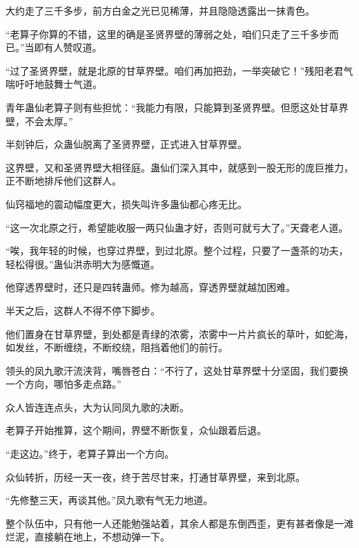 \begin{this_body}
大约走了三千多步，前方白金之光已见稀薄，并且隐隐透露出一抹青色。

“老算子你算的不错，这里的确是圣贤界壁的薄弱之处，咱们只走了三千多步而已。”当即有人赞叹道。

“过了圣贤界壁，就是北原的甘草界壁。咱们再加把劲，一举突破它！”残阳老君气喘吁吁地鼓舞士气道。

青年蛊仙老算子则有些担忧：“我能力有限，只能算到圣贤界壁。但愿这处甘草界壁，不会太厚。”

半刻钟后，众蛊仙脱离了圣贤界壁，正式进入甘草界壁。

这界壁，又和圣贤界壁大相径庭。蛊仙们深入其中，就感到一股无形的庞巨推力，正不断地排斥他们这群人。

仙窍福地的震动幅度更大，损失叫许多蛊仙都心疼无比。

“这一次北原之行，希望能收服一两只仙蛊才好，否则可就亏大了。”天聋老人道。

“唉，我年轻的时候，也穿过界壁，到过北原。整个过程，只要了一盏茶的功夫，轻松得很。”蛊仙洪赤明大为感慨道。

他穿透界壁时，还只是四转蛊师。修为越高，穿透界壁就越加困难。

半天之后，这群人不得不停下脚步。

他们置身在甘草界壁，到处都是青绿的浓雾，浓雾中一片片疯长的草叶，如蛇海，如发丝，不断缠绕，不断绞绕，阻挡着他们的前行。

领头的凤九歌汗流浃背，嘴唇苍白：“不行了，这处甘草界壁十分坚固，我们要换一个方向，哪怕多走点路。”

众人皆连连点头，大为认同凤九歌的决断。

老算子开始推算，这个期间，界壁不断恢复，众仙跟着后退。

“走这边。”终于，老算子算出一个方向。

众仙转折，历经一天一夜，终于苦尽甘来，打通甘草界壁，来到北原。

“先修整三天，再谈其他。”凤九歌有气无力地道。

整个队伍中，只有他一人还能勉强站着，其余人都是东倒西歪，更有甚者像是一滩烂泥，直接躺在地上，不想动弹一下。

\end{this_body}

